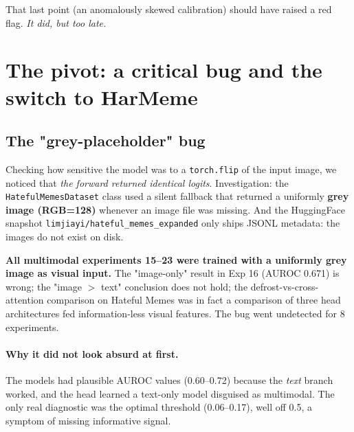 \documentclass[11pt,a4paper]{article}
\begin{document}
\noindent That last point (an anomalously skewed calibration) should have raised a
red flag. \emph{It did, but too late.}

\section{The pivot: a critical bug and the switch to HarMeme}
\label{sec:bug}

\subsection{The "grey-placeholder" bug}

Checking how sensitive the model was to a \texttt{torch.flip} of the input image,
we noticed that \emph{the forward returned identical logits}. Investigation: the
\texttt{HatefulMemesDataset} class used a silent fallback that returned a uniformly
\textbf{grey image (RGB=128)} whenever an image file was missing. And the HuggingFace
snapshot \texttt{limjiayi/hateful\_memes\_expanded} only ships JSONL metadata: the
images do not exist on disk.

\begin{warn}
\textbf{All multimodal experiments 15--23 were trained with a uniformly grey image
as visual input.} The "image-only" result in Exp 16 (AUROC 0.671) is wrong; the
"image $>$ text" conclusion does not hold; the defrost-vs-cross-attention
comparison on Hateful Memes was in fact a comparison of three head architectures
fed information-less visual features. The bug went undetected for 8 experiments.
\end{warn}

\paragraph{Why it did not look absurd at first.} The models had plausible AUROC
values (0.60--0.72) because the \emph{text} branch worked, and the head learned a
text-only model disguised as multimodal. The only real diagnostic was the optimal
threshold (0.06--0.17), well off 0.5, a symptom of missing informative signal.
\end{document}
